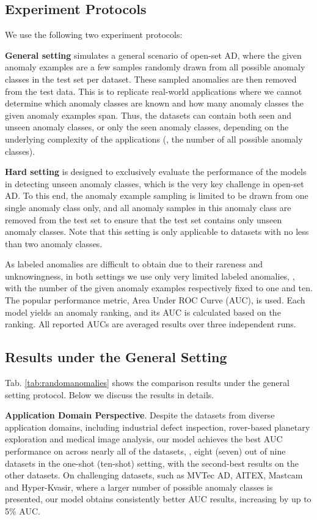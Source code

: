 \documentclass[10pt,twocolumn,letterpaper]{article}
\begin{document}
\subsection{Experiment Protocols}
We use the following two experiment protocols:

\textbf{General setting} simulates a general scenario of open-set AD, where the given anomaly examples are a few samples randomly drawn from all possible anomaly classes in the test set per dataset. These sampled anomalies are then removed from the test data. This is to replicate real-world applications where we cannot determine which anomaly classes are known and how many anomaly classes the given anomaly examples span. Thus, the datasets can contain both seen and unseen anomaly classes, or only the seen anomaly classes, depending on the underlying complexity of the applications (\eg, the number of all possible anomaly classes).


\textbf{Hard setting} is designed to exclusively evaluate the performance of the models in detecting unseen anomaly classes, which is the very key challenge in open-set AD. To this end,
the anomaly example sampling is limited to be drawn from one single anomaly class only, and all anomaly samples in this anomaly class are removed from the test set to ensure that the test set contains only unseen anomaly classes. 
Note that this setting is only applicable to datasets with no less than two anomaly classes.

As labeled anomalies are difficult to obtain due to their rareness and unknowingness, in both settings we use only very limited labeled anomalies, \ie, with the number of the given anomaly examples respectively fixed to one and ten. 
The popular performance metric, Area Under ROC Curve (AUC), is used. Each model yields an anomaly ranking, and its AUC is calculated based on the ranking. All reported AUCs are averaged results over three independent runs.



\subsection{Results under the General Setting}
Tab. \ref{tab:randomanomalies} shows the comparison results 
under the general setting protocol. Below we discuss the results in details.

\textbf{Application Domain Perspective}. Despite the datasets from diverse application domains, including industrial defect inspection, rover-based planetary exploration and medical image analysis, our model achieves the best AUC performance on across nearly all of the datasets, \ie, eight (seven) out of nine datasets in the one-shot (ten-shot) setting, with the second-best results on the other datasets. On challenging datasets, such as MVTec AD, AITEX, Mastcam and Hyper-Kvasir, where a larger number of possible anomaly classes is presented, our model obtains consistently better AUC results, increasing by up to 5\% AUC.
\end{document}
